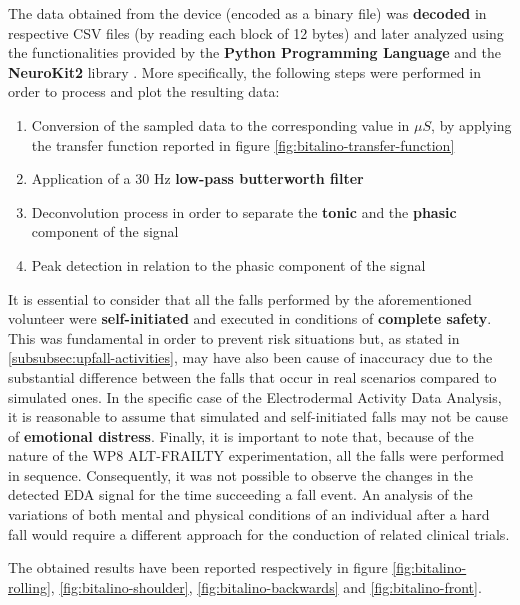 The data obtained from the device (encoded as a binary file) was \textbf{decoded} in respective CSV files (by reading each block of 12 bytes) and later analyzed using the functionalities provided by the \textbf{Python Programming Language} and the \textbf{NeuroKit2} library \cite{neurokit}. More specifically, the following steps were performed in order to process and plot the resulting data:

\begin{enumerate}
    \item Conversion of the sampled data to the corresponding value in $\mu S$, by applying the transfer function reported in figure \ref{fig:bitalino-transfer-function}
    \item Application of a 30 Hz \textbf{low-pass butterworth filter} 
    \item Deconvolution process in order to separate the \textbf{tonic} and the \textbf{phasic} component of the signal
    \item Peak detection in relation to the phasic component of the signal
\end{enumerate}

It is essential to consider that all the falls performed by the aforementioned volunteer were \textbf{self-initiated} and executed in conditions of \textbf{complete safety}. This was fundamental in order to prevent risk situations but, as stated in \ref{subsubsec:upfall-activities}, may have also been cause of inaccuracy due to the substantial difference between the falls that occur in real scenarios compared to simulated ones. In the specific case of the Electrodermal Activity Data Analysis, it is reasonable to assume that simulated and self-initiated falls may not be cause of \textbf{emotional distress}. Finally, it is important to note that, because of the nature of the WP8 ALT-FRAILTY experimentation, all the falls were performed in sequence. Consequently, it was not possible to observe the changes in the detected EDA signal for the time succeeding a fall event. An analysis of the variations of both mental and physical conditions of an individual after a hard fall would require a different approach for the conduction of related clinical trials. 

The obtained results have been reported respectively in figure \ref{fig:bitalino-rolling}, \ref{fig:bitalino-shoulder}, \ref{fig:bitalino-backwards} and \ref{fig:bitalino-front}.

